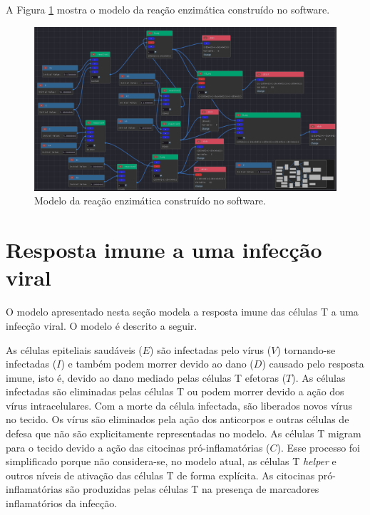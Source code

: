 \documentclass[
	12pt,				%
	openright,			%
	oneside,			%
	a4paper,			%
	main=brazil,
	english,			%
	]{ufsj-abntex2}
\begin{document}
A Figura \ref{fig:reacaoenzimatica} mostra o modelo da reação enzimática construído no software. 

\begin{figure}[h]
    \centering
    \includegraphics[width=\textwidth]{imgs/modelos/reacaoenzimatica.png} 
    \caption{Modelo da reação enzimática construído no software.}
    \label{fig:reacaoenzimatica}
\end{figure}
    
\section{Resposta imune a uma infecção viral}

O modelo apresentado nesta seção modela a resposta imune das células T a uma infecção viral. O modelo é descrito a seguir.  

As células epiteliais saudáveis ($E$) são infectadas pelo vírus ($V$) tornando-se infectadas ($I$) e também podem morrer devido ao dano ($D$) causado pelo resposta imune, isto é, devido ao dano mediado pelas células T efetoras ($T$). As células infectadas são eliminadas pelas células T ou podem morrer devido a ação dos vírus intracelulares. Com a morte da célula infectada, são liberados novos vírus no tecido. Os vírus são eliminados pela ação dos anticorpos e outras células de defesa que não são explicitamente representadas no modelo. As células T migram para o tecido devido a ação das citocinas pró-inflamatórias ($C$). Esse processo foi simplificado porque não considera-se, no modelo atual, as células T \textit{helper} e outros níveis de ativação das células T de forma explícita. As citocinas pró-inflamatórias são produzidas pelas células T na presença de marcadores inflamatórios da infecção.   
\end{document}
